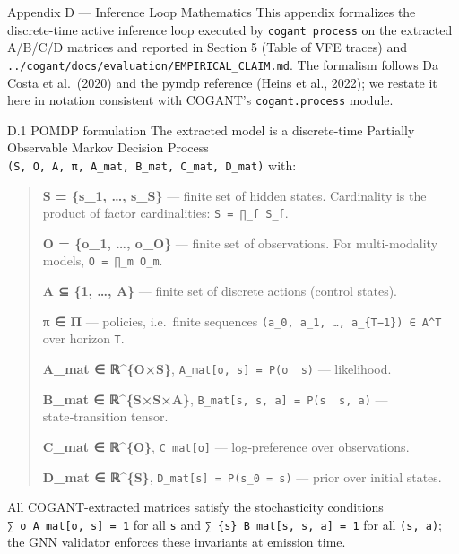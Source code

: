 \documentclass[
  ignorenonframetext,
]{beamer}
\author{\texorpdfstring{}{}}
\date{}
\begin{document}
\begin{frame}[fragile]{Appendix D --- Inference Loop Mathematics}
\protect{}\label{appendix-d-inference-loop-mathematics}
This appendix formalizes the discrete-time active inference loop
executed by \texttt{cogant\ process} on the extracted A/B/C/D matrices
and reported in Section 5 (Table of VFE traces) and
\texttt{../cogant/docs/evaluation/EMPIRICAL\_CLAIM.md}. The formalism
follows Da Costa et al.~(2020) and the pymdp reference (Heins et al.,
2022); we restate it here in notation consistent with COGANT's
\texttt{cogant.process} module.

\begin{block}{D.1 POMDP formulation}
\protect{}\label{d.1-pomdp-formulation}
The extracted model is a discrete-time Partially Observable Markov
Decision Process
\texttt{(S,\ O,\ A,\ π,\ A\_mat,\ B\_mat,\ C\_mat,\ D\_mat)} with:

\begin{quote}
\textbf{S = \{s\_1, \ldots, s\_\textbar S\textbar\}} --- finite set of
hidden states. Cardinality is the product of factor cardinalities:
\texttt{\textbar{}S\textbar{}\ =\ ∏\_f\ \textbar{}S\_f\textbar{}}.

\textbf{O = \{o\_1, \ldots, o\_\textbar O\textbar\}} --- finite set of
observations. For multi-modality models,
\texttt{\textbar{}O\textbar{}\ =\ ∏\_m\ \textbar{}O\_m\textbar{}}.

\textbf{A ⊆ \{1, \ldots, \textbar A\textbar\}} --- finite set of
discrete actions (control states).

\textbf{π ∈ Π} --- policies, i.e.~finite sequences
\texttt{(a\_0,\ a\_1,\ …,\ a\_\{T−1\})\ ∈\ A\^{}T} over horizon
\texttt{T}.

\textbf{A\_mat ∈ ℝ\^{}\{\textbar O\textbar×\textbar S\textbar\}},
\texttt{A\_mat{[}o,\ s{]}\ =\ P(o\ \textbar{}\ s)} --- likelihood.

\textbf{B\_mat ∈
ℝ\^{}\{\textbar S\textbar×\textbar S\textbar×\textbar A\textbar\}},
\texttt{B\_mat{[}s\textquotesingle{},\ s,\ a{]}\ =\ P(s\textquotesingle{}\ \textbar{}\ s,\ a)}
--- state‑transition tensor.

\textbf{C\_mat ∈ ℝ\^{}\{\textbar O\textbar\}}, \texttt{C\_mat{[}o{]}}
--- log‑preference over observations.

\textbf{D\_mat ∈ ℝ\^{}\{\textbar S\textbar\}},
\texttt{D\_mat{[}s{]}\ =\ P(s\_0\ =\ s)} --- prior over initial states.
\end{quote}

All COGANT-extracted matrices satisfy the stochasticity conditions
\texttt{∑\_o\ A\_mat{[}o,\ s{]}\ =\ 1} for all \texttt{s} and
\texttt{∑\_\{s\textquotesingle{}\}\ B\_mat{[}s\textquotesingle{},\ s,\ a{]}\ =\ 1}
for all \texttt{(s,\ a)}; the GNN validator enforces these invariants at
emission time.
\end{block}


\end{frame}
\end{document}
